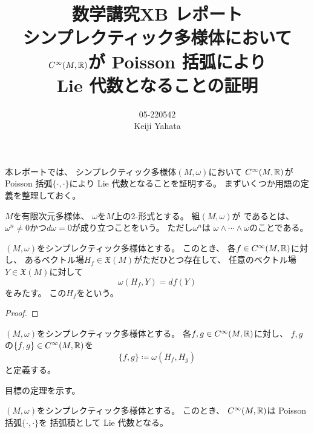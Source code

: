 \documentclass[report, notitlepage]{jlreq}
\title{
    数学講究XB レポート \\[1em]
    シンプレクティック多様体において \\[0.5ex]
    $C^\infty(M, \mathbb{R})$が
    Poisson 括弧により \\[0.5ex]
    Lie 代数となることの証明
}
\author{05-220542 \\ Keiji Yahata}
\date{}
\begin{document}
\maketitle

%
\newpage
\setcounter{section}{1}

本レポートでは、
シンプレクティック多様体$(M, \omega)$において
$C^\infty(M, \mathbb{R})$が
Poisson 括弧$\{ \cdot, \cdot \}$により
Lie 代数となることを証明する。
まずいくつか用語の定義を整理しておく。

\begin{definition}[シンプレクティック多様体]
    $M$を有限次元\smooth 多様体、
    $\omega$を$M$上の2-形式とする。
    組$(M, \omega)$が
    であるとは、
    $\omega^n \neq 0$かつ$d\omega = 0$が成り立つことをいう。
    ただし$\omega^n$は
    $\omega \wedge \cdots \wedge \omega$のことである。
\end{definition}

\begin{propdef}
    $(M, \omega)$をシンプレクティック多様体とする。
    このとき、
    各$f \in C^\infty(M, \mathbb{R})$に対し、
    あるベクトル場$H_f \in \mathfrak{X}(M)$がただひとつ存在して、
    任意のベクトル場$Y \in \mathfrak{X}(M)$に対して
    \begin{equation}
        \omega(H_f, Y) = df(Y)
    \end{equation}
    をみたす。
    この$H_f$をという。
\end{propdef}

\begin{proof}
    \TODO{}
\end{proof}

\begin{definition}[Poisson 括弧]
    $(M, \omega)$をシンプレクティック多様体とする。
    各$f, g \in C^\infty(M, \mathbb{R})$に対し、
    $f, g$の$\{ f, g \} \in C^\infty(M, \mathbb{R})$を
    \begin{equation}
        \{ f, g \} \coloneqq \omega(H_f, H_g)
    \end{equation}
    と定義する。
\end{definition}

目標の定理を示す。

\begin{theorem}
    $(M, \omega)$をシンプレクティック多様体とする。
    このとき、
    $C^\infty(M, \mathbb{R})$は Poisson 括弧$\{ \cdot, \cdot \}$を
    括弧積として Lie 代数となる。
\end{theorem}
\end{document}
